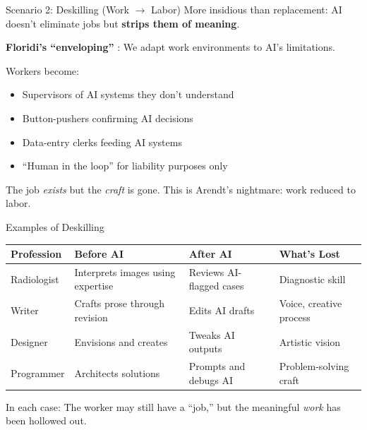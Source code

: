 ﻿\documentclass[aspectratio=169,11pt]{beamer}
\begin{document}
\begin{frame}{Scenario 2: Deskilling (Work $\rightarrow$ Labor)}
More insidious than replacement: AI doesn't eliminate jobs but \textbf{strips them of meaning}.

\vspace{0.2em}
\textbf{Floridi's ``enveloping''} \parencite{floridi_ethics_ai}: We adapt work environments to AI's limitations.

\vspace{0.2em}
Workers become:
\begin{itemize}
    \item Supervisors of AI systems they don't understand
    \item Button-pushers confirming AI decisions
    \item Data-entry clerks feeding AI systems
    \item ``Human in the loop'' for liability purposes only
\end{itemize}

\vspace{0.2em}
The job \emph{exists} but the \emph{craft} is gone. This is Arendt's nightmare: work reduced to labor.
\end{frame}

\begin{frame}{Examples of Deskilling}
\begin{table}[h]
\centering
\scriptsize
\begin{tabular}{@{}p{2cm}p{3.2cm}p{3.2cm}p{3.2cm}@{}}
\toprule
\textbf{Profession} & \textbf{Before AI} & \textbf{After AI} & \textbf{What's Lost} \\
\midrule
Radiologist & Interprets images using expertise & Reviews AI-flagged cases & Diagnostic skill \\
\addlinespace
Writer & Crafts prose through revision & Edits AI drafts & Voice, creative process \\
\addlinespace
Designer & Envisions and creates & Tweaks AI outputs & Artistic vision \\
\addlinespace
Programmer & Architects solutions & Prompts and debugs AI & Problem-solving craft \\
\bottomrule
\end{tabular}
\end{table}

\vspace{0.2em}
In each case: The worker may still have a ``job,'' but the meaningful \emph{work} has been hollowed out.
\end{frame}
\end{document}
